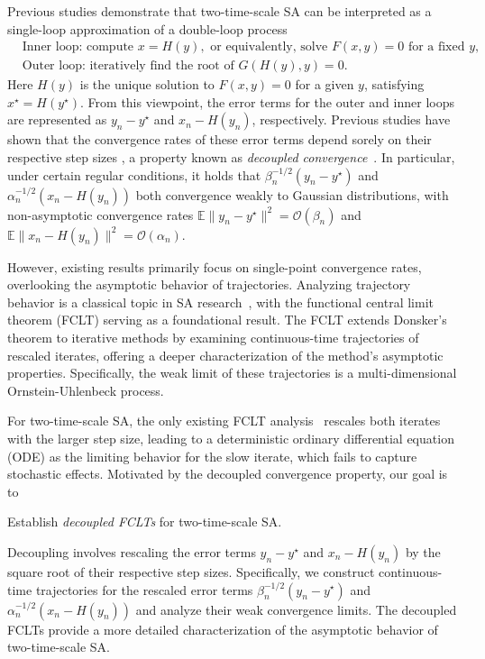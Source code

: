 \documentclass[11pt]{article}
\theoremstyle{plain}
\theoremstyle{definition}
\def\OM{{\mathcal O}}
\def\EB{{\mathbb E}}
\begin{document}
Previous studies demonstrate that two-time-scale SA can be interpreted as a single-loop approximation of a double-loop process~\citep{kaledin2020finite, doan2022nonlinear, han2024finite}
\begin{equation} \label{eq:two-loop-approx}
	\begin{aligned}    
		& \text{Inner loop: compute } x = H(y)
		, \text{ or equivalently, solve } F(x, y) = 0
		\text{ for a fixed } y, \\
		& \text{Outer loop: iteratively find the root of } G(H(y), y) = 0.
	\end{aligned}
\end{equation}
Here $H(y)$ is the unique solution to $F(x,y) = 0$ for a given $y$, satisfying  $x^\star = H(y^\star)$.
From this viewpoint, the error terms for the outer and inner loops are represented as $y_n - y^\star$ and $x_n - H(y_n)$, respectively.
Previous studies have shown that the convergence rates of these error terms depend sorely on their respective step sizes \citep{konda2004convergence, mokkadem2006convergence, kaledin2020finite, han2024finite}, 
a property known as \textit{decoupled convergence}~\citep{han2024finite}.
In particular, under certain regular conditions, it holds that $ \beta_{n}^{-1/2}  (y_{n} - y^\star)$ and $ \alpha_{n}^{-1/2} (x_{n} - H(y_{n}))$ both convergence weakly to Gaussian distributions, with non-asymptotic convergence rates $\EB \| y_n - y^\star \|^2 = \OM(\beta_n) $ and $\EB \| x_n - H(y_n) \|^2 = \OM(\alpha_n)$.

However, existing results primarily focus on single-point convergence rates, overlooking the asymptotic behavior of trajectories. Analyzing trajectory behavior is a classical topic in SA research~\citep{kushner2003stochastic, borkar2009stochastic, benveniste2012adaptive}, with the functional central limit theorem (FCLT) serving as a foundational result. The FCLT extends Donsker's theorem to iterative methods by examining continuous-time trajectories of rescaled iterates, offering a deeper characterization of the method's asymptotic properties. Specifically, the weak limit of these trajectories is a multi-dimensional Ornstein-Uhlenbeck process.

For two-time-scale SA, the only existing FCLT analysis~\citep{faizal2023functional} rescales both iterates with the larger step size, leading to a deterministic ordinary differential equation (ODE) as the limiting behavior for the slow iterate, which fails to capture stochastic effects.
Motivated by the decoupled convergence property, our goal is to 
\begin{center}
	Establish \textit{decoupled FCLTs} for two-time-scale SA. 
\end{center}
Decoupling involves rescaling the error terms $y_{n} - y^\star$ and $x_{n} - H(y_{n})$ by the square root of their respective step sizes. Specifically, we construct continuous-time trajectories for the rescaled error terms $ \beta_{n}^{-1/2} (y_{n} - y^\star)$ and $ \alpha_{n}^{-1/2} (x_{n} - H(y_{n}))$ and analyze their weak convergence limits. The decoupled FCLTs provide a more detailed characterization of the asymptotic behavior of two-time-scale SA.
\end{document}
